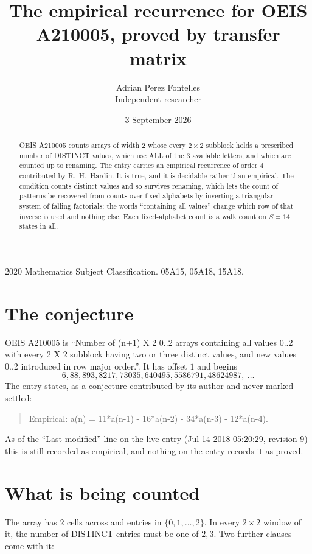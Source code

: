 \documentclass[11pt,a4paper]{article}
\title{The empirical recurrence for OEIS A210005, proved by transfer matrix}
\author{Adrian Perez Fontelles\\ \small Independent researcher}
\date{3 September 2026}
\theoremstyle{plain}
\theoremstyle{definition}
\begin{document}
\maketitle

\begin{abstract}
OEIS A210005 counts arrays of width $2$ whose every $2\times2$ subblock holds a
prescribed number of DISTINCT values, which use ALL of the $3$ available letters, and which
are counted up to renaming. The entry carries an empirical recurrence of order $4$
contributed by R.~H.~Hardin. It is true, and it is decidable rather than empirical. The
condition counts distinct values and so survives renaming, which lets the count of patterns be
recovered from counts over fixed alphabets by inverting a triangular system of falling
factorials; the words ``containing all values'' change which row of that inverse is used and
nothing else. Each fixed-alphabet count is a walk count on $S=14$ states in all.
\end{abstract}

\noindent\small 2020 Mathematics Subject Classification. 05A15, 05A18, 15A18.\normalsize

\section{The conjecture}

OEIS A210005 is ``Number of (n+1) X 2 0..2 arrays containing all values 0..2 with every 2 X 2 subblock having two or three distinct values, and new values 0..2 introduced in row major order.''. It has offset $1$ and begins
\[
6, 88, 893, 8217, 73035, 640495, 5586791, 48624987,\ \dots
\]
The entry states, as a conjecture contributed by its author and never marked settled:
\begin{quote}
Empirical: a(n) = 11*a(n-1) - 16*a(n-2) - 34*a(n-3) - 12*a(n-4).
\end{quote}
As of the ``Last modified'' line on the live entry (Jul 14 2018 05:20:29, revision 9) this is still
recorded as empirical, and nothing on the entry records it as proved.

\section{What is being counted}

The array has $2$ cells across and entries in $\{0,1,\dots,2\}$. In every
$2\times2$ window of it, the number of DISTINCT entries must be one of $2, 3$. Two
further clauses come with it:
\end{document}
